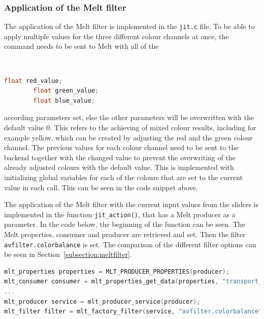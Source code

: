 \documentclass[../MasterThesis.tex]{subfiles}
\begin{document}
\subsubsection*{Application of the Melt filter}


\begin{minipage}{0.60\textwidth}
	The application of the Melt filter is implemented in the \texttt{jit.c} file. To be able to apply multiple values for the three different colour channels at once, the command needs to be sent to Melt with all of the 
\end{minipage}\begin{minipage}{0.04\textwidth}
	\ 
\end{minipage}\begin{minipage}{0.36\textwidth}
	{\tiny\begin{lstlisting}[language=c, numbers=none]
		float red_value;
		float green_value;
		float blue_value; \end{lstlisting}}
	\vfill
\end{minipage}
\vspace*{0.1em}

according parameters set, else the other parameters will be overwritten with the default value $0$. This refers to the achieving of mixed colour results, including for example yellow, which can be created by adjusting the red and the green colour channel. The previous values for each colour channel need to be sent to the backend together with the changed value to prevent the overwriting of the already adjusted colours with the default value. This is implemented with initializing global variables for each of the colours that are set to the current value in each call. This can be seen in the code snippet above.

The application of the Melt filter with the current input values from the sliders is implemented in the function \texttt{jit\_action()}, that has a Melt producer as a parameter. In the code below, the beginning of the function can be seen. The Melt properties, consumer and producer are retrieved and set. Then the filter \texttt{avfilter.colorbalance} is set. The comparison of the different filter options can be seen in Section~\ref{subsection:meltfilter}.


\begin{lstlisting}[language=c, numbers=none, columns=fullflexible]	
mlt_properties properties = MLT_PRODUCER_PROPERTIES(producer);
mlt_consumer consumer = mlt_properties_get_data(properties, "transport_consumer", NULL);
...	
mlt_producer service = mlt_producer_service(producer);
mlt_filter filter = mlt_factory_filter(service, "avfilter.colorbalance", NULL);	
\end{lstlisting}
\end{document}
